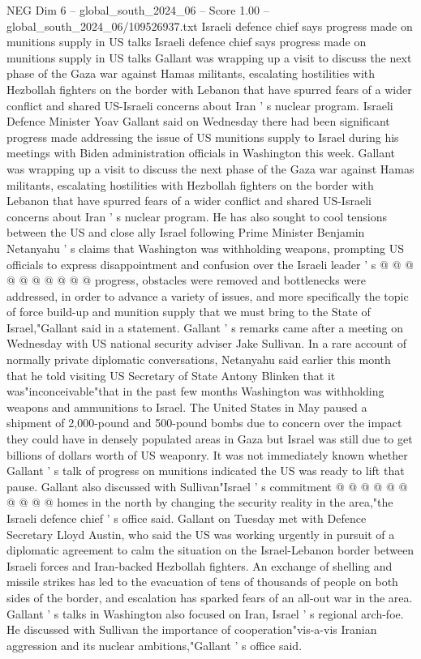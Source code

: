 \begin{textsample}{NEG Dim 6 – global\_south\_2024\_06 – Score 1.00 – global\_south\_2024\_06/109526937.txt}  \label{ex:f6_neg_274}
Israeli defence chief says progress made on munitions supply in US talks Israeli defence chief says progress made on munitions supply in US talks Gallant was wrapping up a visit to discuss the next phase of the Gaza war against Hamas militants, escalating hostilities with Hezbollah fighters on the border with Lebanon that have spurred fears of a wider conflict and shared US-Israeli concerns about Iran ' s nuclear program.
Israeli Defence Minister Yoav Gallant said on Wednesday there had been significant progress made addressing the issue of US munitions supply to Israel during his meetings with Biden administration officials in Washington this week.
Gallant was wrapping up a visit to discuss the next phase of the Gaza war against Hamas militants, escalating hostilities with Hezbollah fighters on the border with Lebanon that have spurred fears of a wider conflict and shared US-Israeli concerns about Iran ' s nuclear program.
He has also sought to cool tensions between the US and close ally Israel following Prime Minister Benjamin Netanyahu ' s claims that Washington was withholding weapons, prompting US officials to express disappointment and confusion over the Israeli leader ' s @ @ @ @ @ @ @ @ @ @ progress, obstacles were removed and bottlenecks were addressed, in order to advance a variety of issues, and more specifically the topic of force build-up and munition supply that we must bring to the State of Israel,"Gallant said in a statement.
Gallant ' s remarks came after a meeting on Wednesday with US national security adviser Jake Sullivan.
In a rare account of normally private diplomatic conversations, Netanyahu said earlier this month that he told visiting US Secretary of State Antony Blinken that it was"inconceivable"that in the past few months Washington was withholding weapons and ammunitions to Israel.
The United States in May paused a shipment of 2,000-pound and 500-pound bombs due to concern over the impact they could have in densely populated areas in Gaza but Israel was still due to get billions of dollars worth of US weaponry.
It was not immediately known whether Gallant ' s talk of progress on munitions indicated the US was ready to lift that pause.
Gallant also discussed with Sullivan"Israel ' s commitment @ @ @ @ @ @ @ @ @ @ homes in the north by changing the security reality in the area,"the Israeli defence chief ' s office said.
Gallant on Tuesday met with Defence Secretary Lloyd Austin, who said the US was working urgently in pursuit of a diplomatic agreement to calm the situation on the Israel-Lebanon border between Israeli forces and Iran-backed Hezbollah fighters.
An exchange of shelling and missile strikes has led to the evacuation of tens of thousands of people on both sides of the border, and escalation has sparked fears of an all-out war in the area.
Gallant ' s talks in Washington also focused on Iran, Israel ' s regional arch-foe.
He discussed with Sullivan the importance of cooperation"vis-a-vis Iranian aggression and its nuclear ambitions,"Gallant ' s office said.

\end{textsample}
